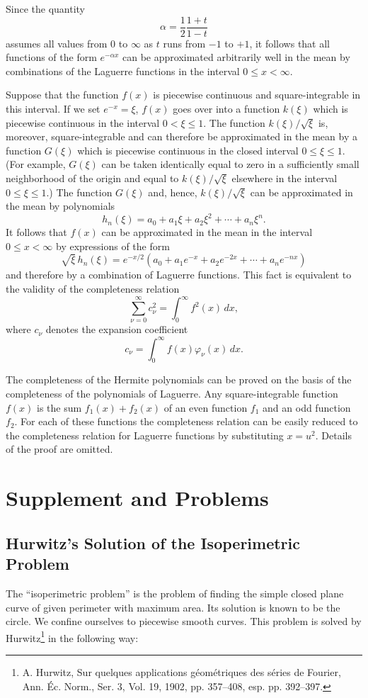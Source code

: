 Since the quantity
\[
\alpha=\frac12\frac{1+t}{1-t}
\]
assumes all values from $0$ to $\infty$ as $t$ runs from $-1$ to $+1$, it follows that all functions of the form $e^{-\alpha x}$ can be approximated arbitrarily well in the mean by combinations of the Laguerre functions in the interval $0\le x<\infty$.

Suppose that the function $f(x)$ is piecewise continuous and square-integrable in this interval. If we set $e^{-x}=\xi$, $f(x)$ goes over into a function $k(\xi)$ which is piecewise continuous in the interval $0<\xi\le1$. The function $k(\xi)/\sqrt{\xi}$ is, moreover, square-integrable and can therefore be approximated in the mean by a function $G(\xi)$ which is piecewise continuous in the closed interval $0\le\xi\le1$.\ctnote{原文此处及紧随其后的括号中将区间变量排作 $x$；上下文中函数均写作 $G(\xi)$、$k(\xi)$，且刚由 $e^{-x}=\xi$ 将问题变换到 $\xi\in(0,1]$，故此处应为 $0\le\xi\le1$。} (For example, $G(\xi)$ can be taken identically equal to zero in a sufficiently small neighborhood of the origin and equal to $k(\xi)/\sqrt{\xi}$ elsewhere in the interval $0\le\xi\le1$.) The function $G(\xi)$ and, hence, $k(\xi)/\sqrt{\xi}$ can be approximated in the mean by polynomials
\[
h_n(\xi)=a_0+a_1\xi+a_2\xi^2+\cdots+a_n\xi^n.
\]
It follows that $f(x)$ can be approximated in the mean in the interval $0\le x<\infty$ by expressions of the form
\[
\sqrt{\xi}\,h_n(\xi)
=e^{-x/2}\left(a_0+a_1e^{-x}+a_2e^{-2x}+\cdots+a_ne^{-nx}\right)
\]
and therefore by a combination of Laguerre functions. This fact is equivalent to the validity of the completeness relation
\[
\sum_{\nu=0}^{\infty}c_\nu^2=\int_0^\infty f^2(x)\,dx,
\]
where $c_\nu$ denotes the expansion coefficient
\[
c_\nu=\int_0^\infty f(x)\varphi_\nu(x)\,dx.
\]

The completeness of the Hermite polynomials can be proved on the basis of the completeness of the polynomials of Laguerre. Any square-integrable function $f(x)$ is the sum $f_1(x)+f_2(x)$ of an even function $f_1$ and an odd function $f_2$. For each of these functions the completeness relation can be easily reduced to the completeness relation for Laguerre functions by substituting $x=u^2$. Details of the proof are omitted.

\section{Supplement and Problems}

\subsection{Hurwitz's Solution of the Isoperimetric Problem}
The ``isoperimetric problem'' is the problem of finding the simple closed plane curve of given perimeter with maximum area. Its solution is known to be the circle. We confine ourselves to piecewise smooth curves. This problem is solved by Hurwitz\footnote{A. Hurwitz, Sur quelques applications g\'eom\'etriques des s\'eries de Fourier, Ann. \'Ec. Norm., Ser. 3, Vol. 19, 1902, pp. 357--408, esp. pp. 392--397.} in the following way:

